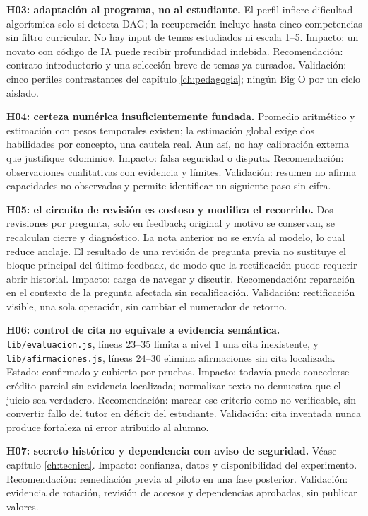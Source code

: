 \documentclass[11pt,a4paper]{report}
\newcommand{\src}[2]{\nolinkurl{#1}, líneas #2}
\begin{document}
\textbf{H03: adaptación al programa, no al estudiante.} El perfil infiere dificultad algorítmica solo si detecta DAG; la recuperación incluye hasta cinco competencias sin filtro curricular. No hay input de temas estudiados ni escala 1--5. Impacto: un novato con código de IA puede recibir profundidad indebida. Recomendación: contrato introductorio y una selección breve de temas ya cursados. Validación: cinco perfiles contrastantes del capítulo \ref{ch:pedagogia}; ningún Big O por un ciclo aislado.

\textbf{H04: certeza numérica insuficientemente fundada.} Promedio aritmético y estimación con pesos temporales existen; la estimación global exige dos habilidades por concepto, una cautela real. Aun así, no hay calibración externa que justifique «dominio». Impacto: falsa seguridad o disputa. Recomendación: observaciones cualitativas con evidencia y límites. Validación: resumen no afirma capacidades no observadas y permite identificar un siguiente paso sin cifra.

\textbf{H05: el circuito de revisión es costoso y modifica el recorrido.} Dos revisiones por pregunta, solo en feedback; original y motivo se conservan, se recalculan cierre y diagnóstico. La nota anterior no se envía al modelo, lo cual reduce anclaje. El resultado de una revisión de pregunta previa no sustituye el bloque principal del último feedback, de modo que la rectificación puede requerir abrir historial. Impacto: carga de navegar y discutir. Recomendación: reparación en el contexto de la pregunta afectada sin recalificación. Validación: rectificación visible, una sola operación, sin cambiar el numerador de retorno.

\textbf{H06: control de cita no equivale a evidencia semántica.} \src{lib/evaluacion.js}{23--35} limita a nivel 1 una cita inexistente, y \src{lib/afirmaciones.js}{24--30} elimina afirmaciones sin cita localizada. Estado: confirmado y cubierto por pruebas. Impacto: todavía puede concederse crédito parcial sin evidencia localizada; normalizar texto no demuestra que el juicio sea verdadero. Recomendación: marcar ese criterio como no verificable, sin convertir fallo del tutor en déficit del estudiante. Validación: cita inventada nunca produce fortaleza ni error atribuido al alumno.

\textbf{H07: secreto histórico y dependencia con aviso de seguridad.} Véase capítulo \ref{ch:tecnica}. Impacto: confianza, datos y disponibilidad del experimento. Recomendación: remediación previa al piloto en una fase posterior. Validación: evidencia de rotación, revisión de accesos y dependencias aprobadas, sin publicar valores.
\end{document}
